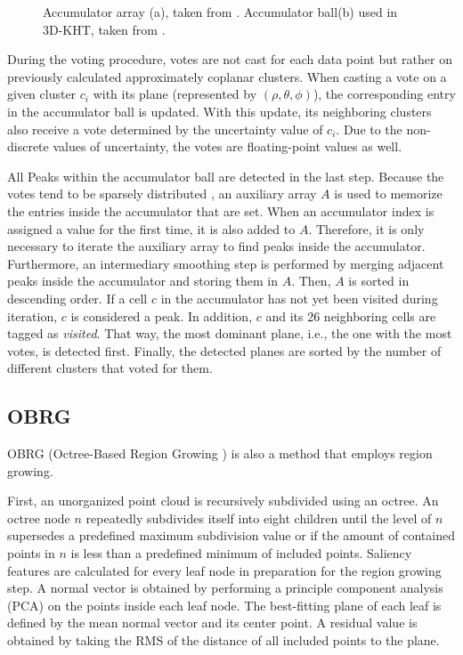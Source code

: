 \documentclass[main.tex]{subfiles}
\begin{document}
\begin{figure}[H]
\begin{subfigure}{0.25\textwidth}
        \caption[3D-KHT Accumulator Ball]{}
        \label{fig:accball}
    \end{subfigure}
    \hspace{\fill}
    \caption[Hough Transform Accumulators]{Accumulator array (a), taken from \cite*[Figure~3]{Borrmann_Elseberg_Lingemann_Nüchter_2011}. Accumulator
        ball(b) used in 3D-KHT, taken from \cite*[Figure~5]{Limberger_Oliveira_2015}.}
\end{figure}

During the voting procedure, votes are not cast for each data point but rather on previously calculated approximately coplanar clusters.
When casting a vote on a given cluster $c_i$ with its plane (represented by $(\rho, \theta, \phi)$), the corresponding entry in the accumulator ball is updated.
With this update, its neighboring clusters also receive a vote determined by the uncertainty value of $c_i$. Due to the non-discrete
values of uncertainty, the votes are floating-point values as well.

All Peaks within the accumulator ball are detected in the last step. Because the votes tend to be sparsely distributed \cite[Section~3.4]{Limberger_Oliveira_2015},
an auxiliary array $A$ is used to memorize the entries inside the accumulator that are set. When an accumulator index is assigned a value for the first time, it is also added to $A$.
Therefore, it is only necessary to iterate the auxiliary array to find peaks inside the accumulator.
Furthermore, an intermediary smoothing step is performed by merging adjacent peaks inside the accumulator and storing them in $A$.
Then, $A$ is sorted in descending order.
If a cell $c$ in the accumulator has not yet been visited during iteration, $c$ is considered a peak. In addition, $c$ and its 26 neighboring cells are tagged as \textit{visited}.
That way, the most dominant plane, i.e., the one with the most votes, is detected first.
Finally, the detected planes are sorted by the number of different clusters that voted for them.

\subsection{OBRG} \label{sec:bg-obrg}
OBRG (Octree-Based Region Growing \cite{Vo_Truong-Hong_Laefer_Bertolotto_2015}) is also a method that employs region growing.

First, an unorganized point cloud is recursively subdivided using an octree.
An octree node $n$ repeatedly subdivides itself into eight children until the level of $n$ supersedes a predefined maximum subdivision value or if the
amount of contained points in $n$ is less than a predefined minimum of included points.
Saliency features are calculated for every leaf node in preparation for the region growing step. A normal vector is obtained by performing a principle
component analysis (PCA) on the points inside each leaf node. The best-fitting plane of each leaf is defined by the mean normal vector and its center point.
A residual value is obtained by taking the RMS of the distance of all included points to the plane.
\end{document}
